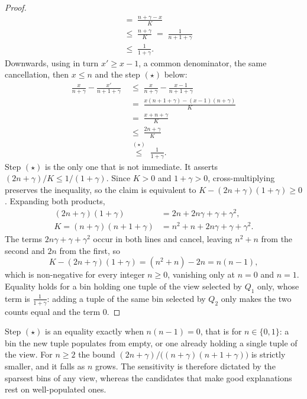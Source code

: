 \begin{proof}
\begin{align*}
&\;=\;\frac{n+\gamma-x}{K}\\[2pt]
&\;\le\;\frac{n+\gamma}{K}\;=\;\frac{1}{n+1+\gamma}\\[2pt]
&\;\le\;\frac{1}{1+\gamma}.
\end{align*}
Downwards, using in turn $x'\ge x-1$, a common denominator, the same cancellation, then $x\le n$ and the step $(\star)$ below:
\begin{align*}
\frac{x}{n+\gamma}-\frac{x'}{n+1+\gamma}
&\;\le\;\frac{x}{n+\gamma}-\frac{x-1}{n+1+\gamma}\\[2pt]
&\;=\;\frac{x(n+1+\gamma)-(x-1)(n+\gamma)}{K}\\[2pt]
&\;=\;\frac{x+n+\gamma}{K}\\[2pt]
&\;\le\;\frac{2n+\gamma}{K}\\[2pt]
&\;\overset{(\star)}{\le}\;\frac{1}{1+\gamma}.
\end{align*}
Step $(\star)$ is the only one that is not immediate.
It asserts $(2n+\gamma)/K\le 1/(1+\gamma)$.
Since $K>0$ and $1+\gamma>0$, cross-multiplying preserves the inequality, so the claim is equivalent to $K-(2n+\gamma)(1+\gamma)\ge0$.
Expanding both products,
\begin{align*}
(2n+\gamma)(1+\gamma)&=2n+2n\gamma+\gamma+\gamma^2,\\[2pt]
K=(n+\gamma)(n+1+\gamma)&=n^2+n+2n\gamma+\gamma+\gamma^2 .
\end{align*}
The terms $2n\gamma+\gamma+\gamma^2$ occur in both lines and cancel, leaving $n^2+n$ from the second and $2n$ from the first, so
\[
K-(2n+\gamma)(1+\gamma)=(n^2+n)-2n=n(n-1),
\]
which is non-negative for every integer $n\ge0$, vanishing only at $n=0$ and $n=1$.
Equality holds for a bin holding one tuple of the view selected by $Q_1$ only, whose term is $\frac{1}{1+\gamma}$: adding a tuple of the same bin selected by $Q_2$ only makes the two counts equal and the term $0$.
\end{proof}

Step $(\star)$ is an equality exactly when $n(n-1)=0$, that is for $n\in\{0,1\}$: a bin the new tuple populates from empty, or one already holding a single tuple of the view.
For $n\ge2$ the bound $(2n+\gamma)/\big((n+\gamma)(n+1+\gamma)\big)$ is strictly smaller, and it falls as $n$ grows.
The sensitivity is therefore dictated by the sparsest bins of any view, whereas the candidates that make good explanations rest on well-populated ones.


